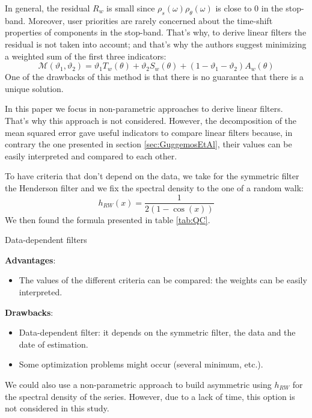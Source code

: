 \documentclass[
  12pt,
  ,
  a4paper]{article}
\providecommand{\tightlist}{%
  \setlength{\itemsep}{0pt}\setlength{\parskip}{0pt}}
\newcommand\1{\mathds{1}}
\begin{document}
In general, the residual \(R_w\) is small since \(\rho_s(\omega)\rho_\theta(\omega)\) is close to 0 in the stop-band.
Moreover, user priorities are rarely concerned about the time-shift properties of components in the stop-band.
That's why, to derive linear filters the residual is not taken into account; and that's why the authors suggest minimizing a weighted sum of the first three indicators:
\[
\mathcal{M}(\vartheta_{1},\vartheta_{2})=\vartheta_{1}T_w(\theta)+\vartheta_{2}S_w(\theta)+(1-\vartheta_{1}-\vartheta_{2})A_w(\theta)
\]
One of the drawbacks of this method is that there is no guarantee that there is a unique solution.

In this paper we focus in non-parametric approaches to derive linear filters.
That's why this approach is not considered.
However, the decomposition of the mean squared error gave useful indicators to compare linear filters because, in contrary the one presented in section \ref{sec:GuggemosEtAl}, their values can be easily interpreted and compared to each other.

To have criteria that don't depend on the data, we take for the symmetric filter the Henderson filter and we fix the spectral density to the one of a random walk:
\[
h_{RW}(x)=\frac{1}{2(1-\cos(x))}
\]
We then found the formula presented in table \ref{tab:QC}.

\begin{summary}{Data-dependent filters}

\textbf{Advantages}:

\begin{itemize}
\tightlist
\item
  The values of the different criteria can be compared: the weights can be easily interpreted.
\end{itemize}

\textbf{Drawbacks}:

\begin{itemize}
\item
  Data-dependent filter: it depends on the symmetric filter, the data and the date of estimation.
\item
  Some optimization problems might occur (several minimum, etc.).
\end{itemize}

\end{summary}

We could also use a non-parametric approach to build asymmetric using \(h_{RW}\) for the spectral density of the series.
However, due to a lack of time, this option is not considered in this study.
\end{document}
